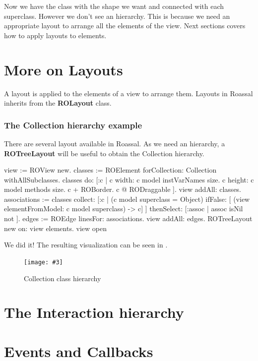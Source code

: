 \documentclass[a4paper,10pt,twoside]{book}
\newcommand{\largefig}[4]{
		\begin{figure}[#1]
			\centering
			\texttt{[image: \#3]}
			\caption{\label{fig:#3}#4}
		\end{figure}}
\begin{document}
Now we have the class  with the shape we want and connected with each superclass. However we don't see an hierarchy. This is because we need an appropriate layout to arrange all the elements of the view. Next sections covers how to apply layouts to elements.


\section{More on Layouts} 

A layout is applied to the elements of a view to arrange them. Layouts in Roassal inherits from the \textbf{ROLayout} class. 


\subsubsection*{The Collection hierarchy example}
There are several layout available in Roassal. As we need an hierarchy, a \textbf{ROTreeLayout} will be useful to obtain the Collection hierarchy.

\begin{code}{}
view := ROView new.
classes := ROElement forCollection: Collection withAllSubclasses.
classes do: [:c | 
	c width: c model instVarNames size.
	c height: c model methods size.
	c + ROBorder. 
	c @ RODraggable ].
view addAll: classes.
associations := classes collect: [:c | 
	(c model superclass = Object)
		ifFalse: [ (view elementFromModel: c model superclass) -> c]
	 ] thenSelect: [:assoc | assoc isNil not ].
edges := ROEdge linesFor: associations.
view addAll: edges.
ROTreeLayout new on: view elements.
view open
\end{code}

We did it! The resulting visualization can be seen in .

\largefig{}{0.5}{collectionHierarchy}{Collection class hierarchy}

\section{The Interaction hierarchy}




\section{Events and Callbacks}
\end{document}

